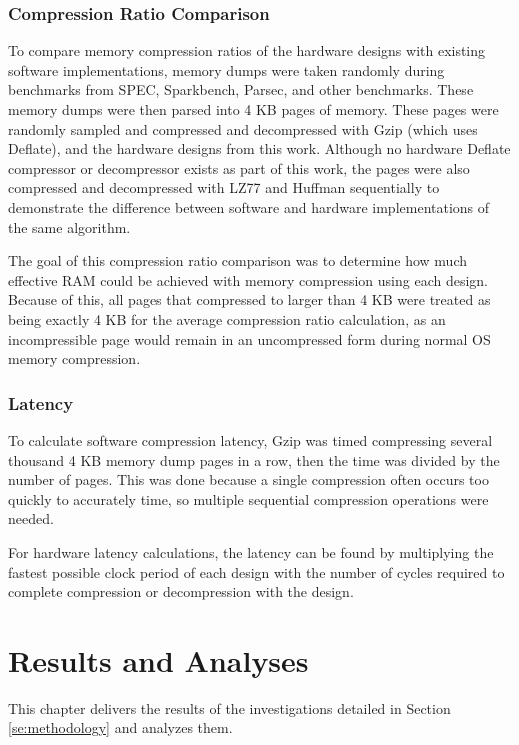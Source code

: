 \documentclass[doublespace,nopageskip]{VTthesis}
\begin{document}
\subsection{Compression Ratio Comparison}\label{ss:compression_ratio_comparison_methodology}
To compare memory compression ratios of the hardware designs with existing software implementations, memory dumps were taken randomly during benchmarks from SPEC, Sparkbench, Parsec, and other benchmarks. These memory dumps were then parsed into 4 KB pages of memory. These pages were randomly sampled and compressed and decompressed with Gzip (which uses Deflate), and the hardware designs from this work. Although no hardware Deflate compressor or decompressor exists as part of this work, the pages were also compressed and decompressed with LZ77 and Huffman sequentially to demonstrate the difference between software and hardware implementations of the same algorithm.

The goal of this compression ratio comparison was to determine how much effective RAM could be achieved with memory compression using each design. Because of this, all pages that compressed to larger than 4 KB were treated as being exactly 4 KB for the average compression ratio calculation, as an incompressible page would remain in an uncompressed form during normal OS memory compression.

\subsection{Latency}\label{ss:latency}
To calculate software compression latency, Gzip was timed compressing several thousand 4 KB memory dump pages in a row, then the time was divided by the number of pages. This was done because a single compression often occurs too quickly to accurately time, so multiple sequential compression operations were needed.

For hardware latency calculations, the latency can be found by multiplying the fastest possible clock period of each design with the number of cycles required to complete compression or decompression with the design. 

\chapter{Results and Analyses} \label{ch:results}
This chapter delivers the results of the investigations detailed in Section \ref{se:methodology} and analyzes them.
\end{document}
